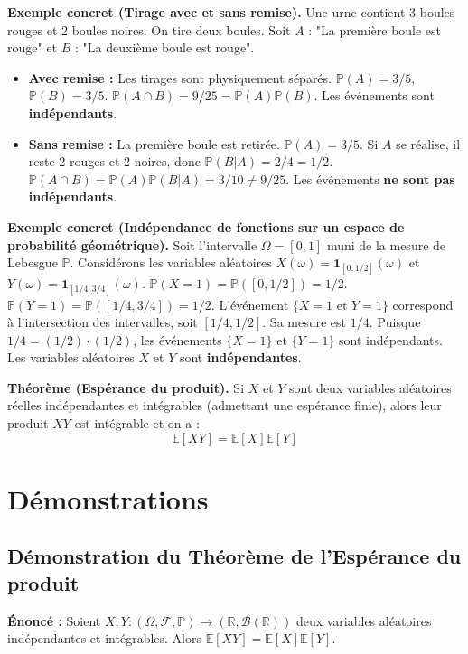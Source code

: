 \documentclass[11pt,a4paper]{article}
\begin{document}
\textbf{Exemple concret (Tirage avec et sans remise).}
Une urne contient 3 boules rouges et 2 boules noires. On tire deux boules.
Soit $A$ : "La première boule est rouge" et $B$ : "La deuxième boule est rouge".
\begin{itemize}
\item \textbf{Avec remise :} Les tirages sont physiquement séparés. $\mathbb{P}(A) = 3/5$, $\mathbb{P}(B) = 3/5$. $\mathbb{P}(A \cap B) = 9/25 = \mathbb{P}(A)\mathbb{P}(B)$. Les événements sont \textbf{indépendants}.
\item \textbf{Sans remise :} La première boule est retirée. $\mathbb{P}(A) = 3/5$. Si $A$ se réalise, il reste 2 rouges et 2 noires, donc $\mathbb{P}(B|A) = 2/4 = 1/2$. $\mathbb{P}(A \cap B) = \mathbb{P}(A)\mathbb{P}(B|A) = 3/10 \neq 9/25$. Les événements \textbf{ne sont pas indépendants}.
\end{itemize}
\textbf{Exemple concret (Indépendance de fonctions sur un espace de probabilité géométrique).}
Soit l'intervalle $\Omega = [0, 1]$ muni de la mesure de Lebesgue $\mathbb{P}$. Considérons les variables aléatoires $X(\omega) = \mathbf{1}_{[0, 1/2]}(\omega)$ et $Y(\omega) = \mathbf{1}_{[1/4, 3/4]}(\omega)$.
$\mathbb{P}(X = 1) = \mathbb{P}([0, 1/2]) = 1/2$.
$\mathbb{P}(Y = 1) = \mathbb{P}([1/4, 3/4]) = 1/2$.
L'événement $\{X=1 \text{ et } Y=1\}$ correspond à l'intersection des intervalles, soit $[1/4, 1/2]$. Sa mesure est $1/4$.
Puisque $1/4 = (1/2) \cdot (1/2)$, les événements $\{X=1\}$ et $\{Y=1\}$ sont indépendants. Les variables aléatoires $X$ et $Y$ sont \textbf{indépendantes}.


\textbf{Théorème (Espérance du produit).} Si $X$ et $Y$ sont deux variables aléatoires réelles indépendantes et intégrables (admettant une espérance finie), alors leur produit $XY$ est intégrable et on a :
$$ \mathbb{E}[XY] = \mathbb{E}[X]\mathbb{E}[Y] $$

\section{Démonstrations}

\subsection{Démonstration du Théorème de l'Espérance du produit}

\textbf{Énoncé :} Soient $X, Y : (\Omega, \mathcal{F}, \mathbb{P}) \to (\mathbb{R}, \mathcal{B}(\mathbb{R}))$ deux variables aléatoires indépendantes et intégrables. Alors $\mathbb{E}[XY] = \mathbb{E}[X]\mathbb{E}[Y]$.
\end{document}
